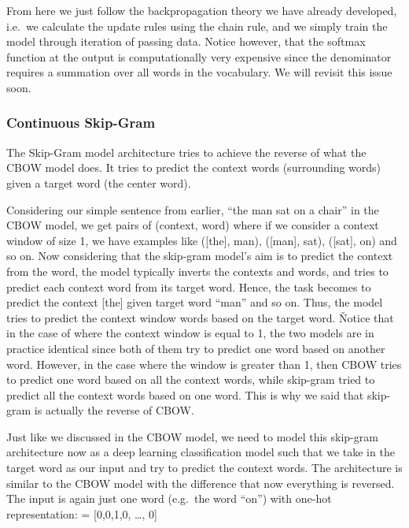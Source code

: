 From here we just follow the backpropagation theory we have already developed, i.e.\ we calculate the update rules
using the chain rule, and we simply train the model through iteration of passing data. Notice however, that the
softmax function at the output is computationally very expensive since the denominator requires a summation over all
words in the vocabulary. We will revisit this issue soon.

\subsubsection{Continuous Skip-Gram}

The Skip-Gram model architecture tries to achieve the reverse of what the CBOW model does. It tries to predict the
context words (surrounding words) given a target word (the center word).

\be
Considering our simple sentence from earlier, ``the man sat on a chair'' in the CBOW model, we get pairs of (context,
word) where if we consider a context window of size 1, we have examples like ([the], man), ([man], sat), ([sat], on)
and so on. Now considering that the skip-gram model's aim is to predict the context from the word, the model
typically inverts the contexts and words, and tries to predict each context word from its target word. Hence, the
task becomes to predict the context [the] given target word ``man'' and so on. Thus, the model tries to predict the
context window words based on the target word. \v

Notice that in the case of where the context window is equal to 1, the two models are in practice identical since
both of them try to predict one word based on another word. However, in the case where the window is greater than 1,
then CBOW tries to predict one word based on all the context words, while skip-gram tried to predict all the context
words based on one word. This is why we said that skip-gram is actually the reverse of CBOW\@.

\ee

Just like we discussed in the CBOW model, we need to model this skip-gram architecture now as a deep learning
classification model such that we take in the target word as our input and try to predict the context words. The
architecture is similar to the CBOW model with the difference that now everything is reversed. The input is again
just one word (e.g.\ the word ``on'') with one-hot representation:
\bse
{} = [0,0,1,0, \ldots, 0]
\ese


